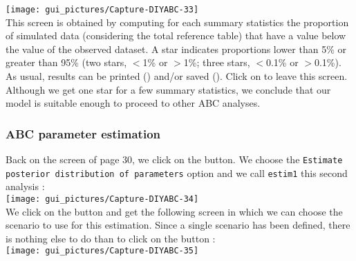 \texttt{[image: gui\_pictures/Capture-DIYABC-33]} \\


This screen is obtained by computing for each summary statistics the
proportion of simulated data (considering the total reference table)
that have a value below the value of the observed dataset. A star
indicates proportions lower than 5\% or greater than 95\% (two stars,
$<$1\% or $>$1\%; three stars, $<$0.1\% or $>$0.1\%).\\


As usual, results can be printed () and/or
saved (). Click on  to leave
this screen.\\


Although we get one star for a few summary statistics, we conclude
that our model is suitable enough to proceed to other ABC analyses.


\subsubsection{ABC parameter estimation}

Back on the screen of page 30, we click on the  button. We choose the \texttt{Estimate posterior distribution
of parameters} option and we call \texttt{estim1} this second analysis
:\\


\texttt{[image: gui\_pictures/Capture-DIYABC-34]} \\


We click on the  button and get the following
screen in which we can choose the scenario to use for this estimation.
Since a single scenario has been defined, there is nothing else to
do than to click on the  button : \\


\texttt{[image: gui\_pictures/Capture-DIYABC-35]} \\


